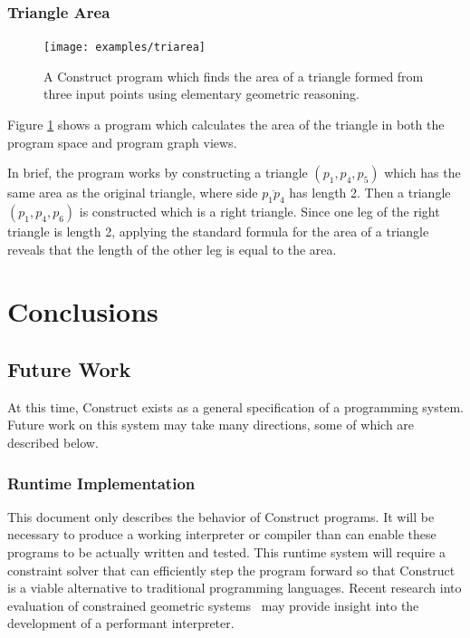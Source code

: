 \documentclass[twoside,openright,11pt]{report}
\begin{document}
\pagebreak

\subsection{Triangle Area}
\label{subsec:triarea}

\begin{figure}[h]
  \centering
  \texttt{[image: examples/triarea]}
  \caption{A Construct program which finds the area of a triangle formed from three input points using elementary geometric reasoning.}
  \label{fig:triarea}
\end{figure}

Figure \ref{fig:triarea} shows a program which calculates the area of the triangle in both the program space and program graph views.

In brief, the program works by constructing a triangle $(p_1,p_4,p_5)$ which has the same area as the original triangle, where side $\overline{p_1p_4}$ has length 2.
Then a triangle $(p_1,p_4,p_6)$ is constructed which is a right triangle. 
Since one leg of the right triangle is length 2, applying the standard formula for the area of a triangle reveals that the length of the other leg is equal to the area.

\chapter{Conclusions}
\label{chap:conclusions}

\section{Future Work}
\label{sec:future}

At this time, Construct exists as a general specification of a programming system. 
Future work on this system may take many directions, some of which are described below.

\subsection{Runtime Implementation}

This document only describes the behavior of Construct programs. 
It will be necessary to produce a working interpreter or compiler than can enable these programs to be actually written and tested. 
This runtime system will require a constraint solver that can efficiently step the program forward so that Construct is a viable alternative to traditional programming languages. 
Recent research into evaluation of constrained geometric systems~\cite{alberti2001objsa,freixas2010constraint,pion2006lazy} may provide insight into the development of a performant interpreter.
\end{document}
